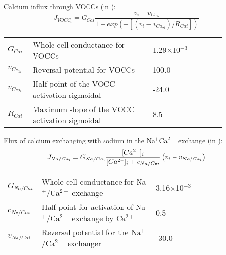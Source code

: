 \documentclass[fleqn]{report}
\numberwithin{equation}{section}
\numberwithin{equation}{section}
\begin{document}
	Calcium influx through VOCCs (in \uMs): 
	\begin{equation} \label{eq:JVOCCi}
	J_{VOCC_{i}} = G_{Cai} \frac{v_{i}-v_{Ca_{1i}}}     {1+ exp(-\left[ \left(  v_{i}-v_{Ca_{2i}}\right) /R_{Cai}      \right] )}
	\end{equation}
	\begin{table}[h!]
	\centering
	\begin{tabular}{ p{0.09\linewidth}  >{\footnotesize} p{0.5\linewidth}  >{\footnotesize} p{0.27\linewidth} >{\footnotesize} p{0.03\linewidth} }
	\hline
	$G_{Cai}$      	& Whole-cell conductance for VOCCs	 					& 1.29$\times$10$^{-3}$  \uMpmVs					& \cite{Koenigsberger2006} \\
	$v_{Ca_{1i}}$   & Reversal potential for VOCCs	 						& 100.0 \mV							& \cite{Koenigsberger2006} \\
	$v_{Ca_{2i}}$  	& Half-point of the VOCC activation sigmoidal		 	& -24.0 \mV							& \cite{Koenigsberger2006} \\
	$R_{Cai}$      	& Maximum slope of the VOCC	activation sigmoidal		& 8.5 \mV							& \cite{Koenigsberger2006} \\
	\hline
	\end{tabular}
	\label{tab:JVOCCi}
	\end{table}
	\newpage
	Flux of calcium exchanging with sodium in the Na$^{+}$Ca$^{2+}$ exchange (in \uMs): 
	\begin{equation} \label{eq:JNaCai}
	J_{Na/Ca_{i}} = G_{Na/Ca_{i}} \frac{[Ca^{2+}]_{i}}     {[Ca^{2+}]_{i} + c_{Na/Cai}} \left( v_{i}-v_{Na/Ca_{i}} \right)
	\end{equation}
	\begin{table}[h!]
	\centering
	\begin{tabular}{ p{0.09\linewidth}  >{\footnotesize} p{0.5\linewidth}  >{\footnotesize} p{0.27\linewidth} >{\footnotesize} p{0.03\linewidth} }
	\hline
	$G_{Na/Cai}$   	& Whole-cell conductance for Na$^{+}$/Ca$^{2+}$ exchange			 		 & 3.16$\times$10$^{-3}$ \uMpmVs	& \cite{Koenigsberger2006} \\
	$c_{Na/Cai}$   	& Half-point for activation of Na$^{+}$/Ca$^{2+}$ exchange by Ca$^{2+}$		 & 0.5 \uM			& \cite{Koenigsberger2006} \\
	$v_{Na/Cai}$   	& Reversal potential for the Na$^{+}$/Ca$^{2+}$ exchanger					 & -30.0 \mV		& \cite{Koenigsberger2006} \\
	\hline
	\end{tabular}
	\label{tab:JNaCai}
	\end{table}
	\\
\end{document}
